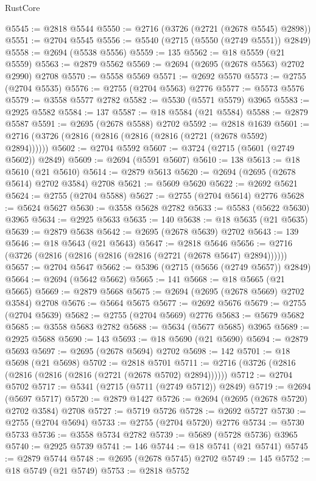 \begin{lexlean}{RustCore}
\begin{coremodule}
@5545 := @2818 @5544
@5550 := @2716 (@3726 (@2721 (@2678 @5545) @2898))
@5551 := @2704 @5545
@5556 := @5540 (@2715 (@5550 (@2749 @5551)) @2849)
@5558 := @2694 (@5538 @5556)
@5559 := 135
@5562 := @18 @5559 (@21 @5559)
@5563 := @2879 @5562
@5569 := @2694 (@2695 (@2678 @5563) @2702 @2990) @2708
@5570 := @5558 @5569
@5571 := @2692 @5570
@5573 := @2755 (@2704 @5535)
@5576 := @2755 (@2704 @5563) @2776
@5577 := @5573 @5576
@5579 := @3558 @5577 @2782
@5582 := @5530 (@5571 @5579) @3965
@5583 := @2925 @5582
@5584 := 137
@5587 := @18 @5584 (@21 @5584)
@5588 := @2879 @5587
@5591 := @2695 (@2678 @5588) @2702
@5592 := @2818 @1639
@5601 := @2716 (@3726 (@2816 (@2816 (@2816 (@2816 (@2721 (@2678 @5592) @2894))))))
@5602 := @2704 @5592
@5607 := @3724 (@2715 (@5601 (@2749 @5602)) @2849)
@5609 := @2694 (@5591 @5607)
@5610 := 138
@5613 := @18 @5610 (@21 @5610)
@5614 := @2879 @5613
@5620 := @2694 (@2695 (@2678 @5614) @2702 @3584) @2708
@5621 := @5609 @5620
@5622 := @2692 @5621
@5624 := @2755 (@2704 @5588)
@5627 := @2755 (@2704 @5614) @2776
@5628 := @5624 @5627
@5630 := @3558 @5628 @2782
@5633 := @5583 (@5622 @5630) @3965
@5634 := @2925 @5633
@5635 := 140
@5638 := @18 @5635 (@21 @5635)
@5639 := @2879 @5638
@5642 := @2695 (@2678 @5639) @2702
@5643 := 139
@5646 := @18 @5643 (@21 @5643)
@5647 := @2818 @5646
@5656 := @2716 (@3726 (@2816 (@2816 (@2816 (@2816 (@2721 (@2678 @5647) @2894))))))
@5657 := @2704 @5647
@5662 := @5396 (@2715 (@5656 (@2749 @5657)) @2849)
@5664 := @2694 (@5642 @5662)
@5665 := 141
@5668 := @18 @5665 (@21 @5665)
@5669 := @2879 @5668
@5675 := @2694 (@2695 (@2678 @5669) @2702 @3584) @2708
@5676 := @5664 @5675
@5677 := @2692 @5676
@5679 := @2755 (@2704 @5639)
@5682 := @2755 (@2704 @5669) @2776
@5683 := @5679 @5682
@5685 := @3558 @5683 @2782
@5688 := @5634 (@5677 @5685) @3965
@5689 := @2925 @5688
@5690 := 143
@5693 := @18 @5690 (@21 @5690)
@5694 := @2879 @5693
@5697 := @2695 (@2678 @5694) @2702
@5698 := 142
@5701 := @18 @5698 (@21 @5698)
@5702 := @2818 @5701
@5711 := @2716 (@3726 (@2816 (@2816 (@2816 (@2816 (@2721 (@2678 @5702) @2894))))))
@5712 := @2704 @5702
@5717 := @5341 (@2715 (@5711 (@2749 @5712)) @2849)
@5719 := @2694 (@5697 @5717)
@5720 := @2879 @1427
@5726 := @2694 (@2695 (@2678 @5720) @2702 @3584) @2708
@5727 := @5719 @5726
@5728 := @2692 @5727
@5730 := @2755 (@2704 @5694)
@5733 := @2755 (@2704 @5720) @2776
@5734 := @5730 @5733
@5736 := @3558 @5734 @2782
@5739 := @5689 (@5728 @5736) @3965
@5740 := @2925 @5739
@5741 := 146
@5744 := @18 @5741 (@21 @5741)
@5745 := @2879 @5744
@5748 := @2695 (@2678 @5745) @2702
@5749 := 145
@5752 := @18 @5749 (@21 @5749)
@5753 := @2818 @5752

\end{coremodule}
\end{lexlean}
